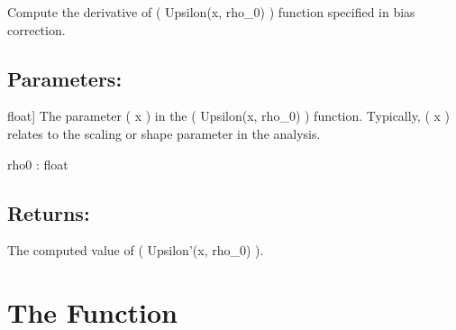 \documentclass[a4paper,11pt,openany,english]{sphinxmanual}
\begin{document}
\begin{fulllineitems}
\label{\detokenize{api_biascorrection:xtremes.biascorrection.Upsilon_derivative}}
\pysigstartsignatures
{}
\pysigstopsignatures
\sphinxAtStartPar
Compute the derivative of ( Upsilon(x, rho\_0) ) function specified in bias correction.


\subsection{Parameters:}
\label{\detokenize{api_biascorrection:id15}}\begin{description}
\sphinxlineitem{x}{[}float{]}
\sphinxAtStartPar
The parameter ( x ) in the ( Upsilon(x,  rho\_0) ) function. Typically, ( x ) relates 
to the scaling or shape parameter in the analysis.

\end{description}

\sphinxAtStartPar
rho0 : float


\subsection{Returns:}
\label{\detokenize{api_biascorrection:id16}}\begin{description}
\sphinxAtStartPar
The computed value of ( Upsilon’(x, rho\_0) ).

\end{description}

\end{fulllineitems}



\section{The  Function}
\label{\detokenize{api_biascorrection:the-upsilon-2ndderivative-function}}
\end{document}
